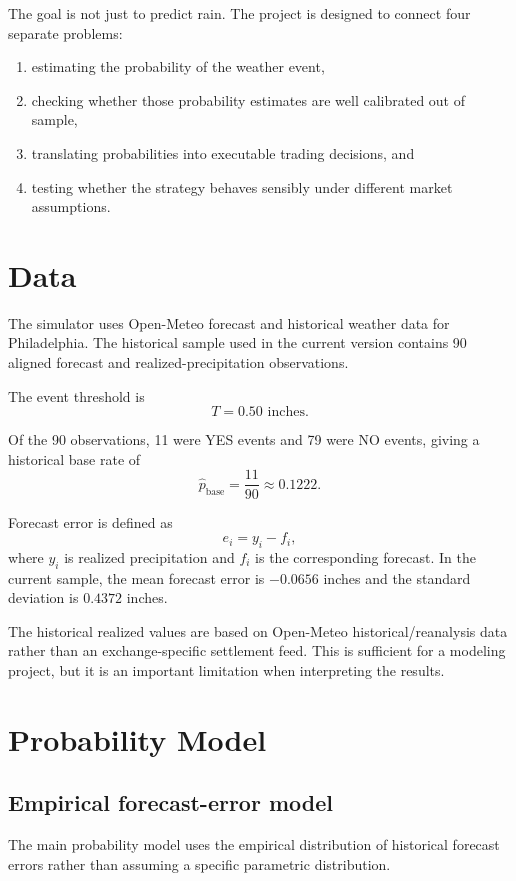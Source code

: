 \documentclass[11pt]{article}
\begin{document}
The goal is not just to predict rain. The project is designed to connect four separate problems:

\begin{enumerate}
    \item estimating the probability of the weather event,
    \item checking whether those probability estimates are well calibrated out of sample,
    \item translating probabilities into executable trading decisions, and
    \item testing whether the strategy behaves sensibly under different market assumptions.
\end{enumerate}

\section{Data}

The simulator uses Open-Meteo forecast and historical weather data for Philadelphia. The historical sample used in the current version contains 90 aligned forecast and realized-precipitation observations.

The event threshold is
\[
T = 0.50 \text{ inches}.
\]

Of the 90 observations, 11 were YES events and 79 were NO events, giving a historical base rate of
\[
\hat p_{\text{base}} = \frac{11}{90} \approx 0.1222.
\]

Forecast error is defined as
\[
e_i = y_i - f_i,
\]
where $y_i$ is realized precipitation and $f_i$ is the corresponding forecast. In the current sample, the mean forecast error is $-0.0656$ inches and the standard deviation is $0.4372$ inches.

The historical realized values are based on Open-Meteo historical/reanalysis data rather than an exchange-specific settlement feed. This is sufficient for a modeling project, but it is an important limitation when interpreting the results.

\section{Probability Model}

\subsection{Empirical forecast-error model}

The main probability model uses the empirical distribution of historical forecast errors rather than assuming a specific parametric distribution.
\end{document}
